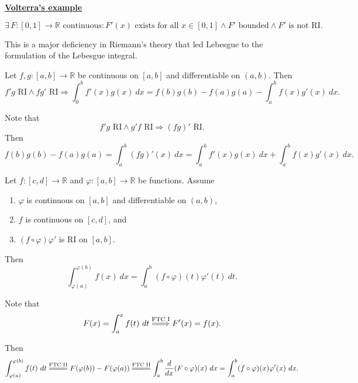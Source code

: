 \documentclass{notes}
\begin{document}
  {\boldmath \bfseries \underline{Volterra's example}}

  \[
    \exists \, F \colon [0, 1] \to \mathbb R \text{ continuous}: \text{$F'(x)$ exists for all $x \in [0, 1]$} \land \text{$F'$ bounded} \land \text{$F'$ is not RI}.
  \]
  
  This is a major deficiency in Riemann's theory that led Lebesgue to the formulation of the Lebesgue integral.
  
  \begin{cor}
    Let $f, g \colon [a, b] \to \mathbb R$ be continuous on $[a, b]$ and differentiable on $(a, b)$.
    Then 
    \[
      \text{$f' g$ RI} \land \text{$f g'$ RI} \Rightarrow \int_0^b f'(x) g(x)\ dx = f(b) g(b) - f(a) g(a) - \int_a^b f(x) g'(x)\ dx.
    \]
  \end{cor}
  
  \begin{prf}
    Note that 
    \[
      \text{$f' g$ RI} \land \text{$g' f$ RI} \Rightarrow \text{$(f g)'$ RI}.
    \]
    Then 
    \[
      f(b) g(b) - f(a) g(a) = \int_a^b (f g)'(x)\ dx = \int_a^b f'(x) g(x)\ dx + \int_a^b f(x) g'(x)\ dx.
    \]
  \end{prf}
  
  \begin{cor}
    Let $f \colon [c, d] \to \mathbb R$ and $\varphi \colon [a, b] \to \mathbb R$ be functions.
    Assume 
    \begin{enumerate}
      \item $\varphi$ is continuous on $[a, b]$ and differentiable on $(a, b)$, 

      \item $f$ is continuous on $[c, d]$, and

      \item $(f \circ \varphi) \varphi'$ is RI on $[a, b]$.
    \end{enumerate}
    Then 
    \[
      \int_{\varphi(a)}^{\varphi(b)} f(x)\ dx = \int_a^b (f \circ \varphi)(t) \varphi'(t)\ dt.
    \]
  \end{cor}
  
  \begin{prf}
    Note that 
    \[
      F(x) = \int_a^x f(t)\ dt \overset{\text{FTC I}}{=\joinrel\Longrightarrow} F'(x) = f(x).
    \]
    
    Then 
    \[
      \int_{\varphi(a)}^{\varphi(b)} f(t)\ dt \overset{\text{FTC II}}{=\joinrel=\joinrel=\joinrel=} F(\varphi(b)) - F(\varphi(a)) \overset{\text{FTC II}}{=\joinrel=\joinrel=\joinrel=} \int_a^b \frac{d}{dx} (F \circ \varphi)(x)\ dx = \int_a^b (f \circ \varphi)(x) \varphi'(x)\ dx.
    \]
  \end{prf}
  
\end{document}
